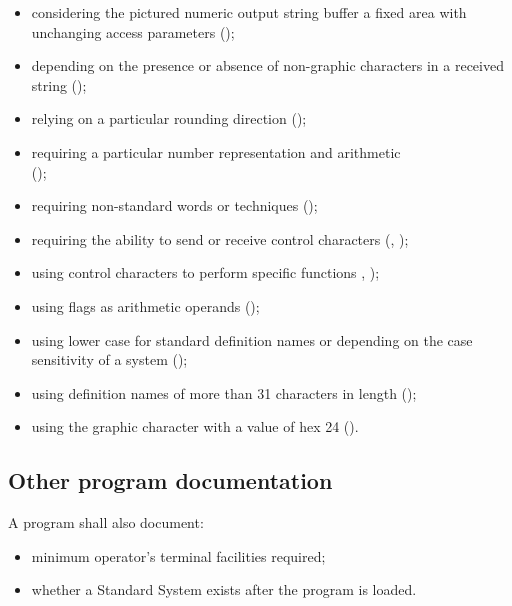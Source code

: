 \begin{itemize}

\item considering the pictured numeric output string buffer a fixed
	area with unchanging access parameters
	();

\item depending on the presence or absence of non-graphic characters
	in a received string ();

\item relying on a particular rounding direction
	();

\item requiring a particular number representation and arithmetic \\
	();

\item requiring non-standard words or techniques
	();

\item requiring the ability to send or receive control characters
	(,
	);

\item using control characters to perform specific functions
	, );

\item using flags as arithmetic operands
	();

\item using lower case for standard definition names or depending
	on the case sensitivity of a system
	();

\item using definition names of more than 31 characters in length
	();

\item using the graphic character with a value of hex 24
	().

\end{itemize}

\subsection{Other program documentation} %

A program shall also document:

\begin{itemize}

\item minimum operator's terminal facilities required;

\item whether a Standard System exists after the program is loaded.

\end{itemize}
